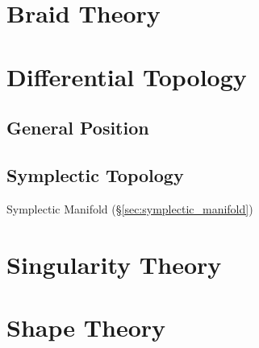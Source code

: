 \section{Braid Theory} \label{sec:braid_theory}

\section{Differential Topology}\label{sec:differential_topology}

\subsection{General Position}\label{sec:general_position}

\subsection{Symplectic Topology}\label{sec:symplectic_topology}

Symplectic Manifold (\S\ref{sec:symplectic_manifold})



\section{Singularity Theory}\label{sec:singularity_theory}

\section{Shape Theory}\label{sec:shape_theory}

